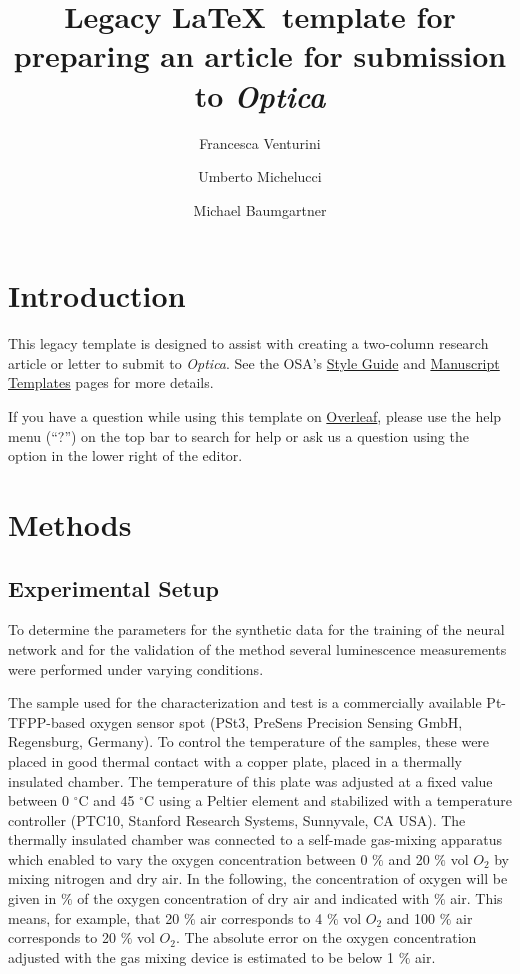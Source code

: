 \documentclass[9pt,twocolumn,twoside]{optica}
\title{Legacy \LaTeX\ template for preparing an article for submission to \emph{Optica}}
\author[1,2,*]{Francesca Venturini}
\author[2]{Umberto Michelucci}
\author[1]{Michael Baumgartner}
\affil[1]{Institute of Applied Mathematics and Physics, Zurich University of Applied Sciences,
Technikumstrasse 9, 8401 Winterthur, Switzerland}
\affil[2]{TOELT LLC; Birchlenstr. 25, 8600 Dübendorf, Switzerland}
\affil[*]{Corresponding author: francesca.venturini@zhaw.ch}
\begin{document}
\maketitle

\section{Introduction}

This legacy template is designed to assist with creating a two-column research article or letter to submit to \emph{Optica}. See the OSA's \href{http://www.opticsinfobase.org/submit/style/}{Style Guide} and \href{http://www.opticsinfobase.org/submit/templates/}{Manuscript Templates} pages for more details.

If you have a question while using this template on \href{https://www.overleaf.com}{Overleaf}, please use the help menu (``?'') on the top bar to search for help or ask us a question using the option in the lower right of the editor.

\section{Methods}
\label{sec:methods}


\subsection{Experimental Setup}
\label{Experimental}

To determine the parameters for the synthetic data for the training of the neural network and for the validation of the method several luminescence measurements were performed under varying conditions.

The sample used for the characterization and test is a commercially available Pt-TFPP-based oxygen sensor spot (PSt3, PreSens Precision Sensing GmbH, Regensburg, Germany).
To control the temperature of the samples, these were placed in good thermal contact with a copper plate, placed in a thermally insulated chamber. The temperature of this plate was adjusted at a fixed value between 0 $^\circ$C and 45 $^\circ$C using a Peltier element and stabilized with a temperature controller (PTC10, Stanford Research Systems, Sunnyvale, CA USA). The thermally insulated chamber was connected to a self-made gas-mixing apparatus which enabled to vary the oxygen concentration between 0 $\%$ and 20 $\%$ vol $O_2$ by mixing nitrogen and dry air. In the following, the concentration of oxygen will be given in $\%$ of the oxygen concentration of dry air and indicated with $\%$ air. This means, for example, that 20 $\%$ air corresponds to 4 $\%$ vol $O_2$ and 100 $\%$ air corresponds to 20 $\%$ vol $O_2$.  
The absolute error on the oxygen concentration adjusted with the gas mixing device is estimated to be below 1 $\%$ air. 
\end{document}
